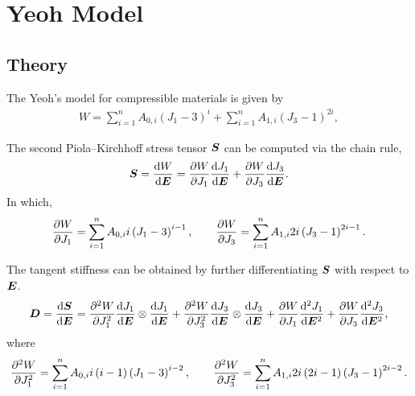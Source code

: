\section{Yeoh Model}
\subsection{Theory}
The Yeoh's model for compressible materials is given by
\begin{gather}
    W=\sum_{i=1}^nA_{0,i}\left(J_1-3\right)^i+\sum_{i=1}^nA_{1,i}\left(J_3-1\right)^{2i},
\end{gather}

The second Piola--Kirchhoff stress tensor $\bm{S}$ can be computed via the chain rule,
\begin{gather}
    \bm{S}=\dfrac{\mathrm{d}W}{\mathrm{d}\bm{E}}=\dfrac{\partial{W}}{\partial{J_1}}\dfrac{\mathrm{d}J_1}{\mathrm{d}\bm{E}}+\dfrac{\partial{W}}{\partial{J_3}}\dfrac{\mathrm{d}J_3}{\mathrm{d}\bm{E}}.
\end{gather}
In which,
\begin{gather}
    \dfrac{\partial{W}}{\partial{J_1}}=\sum_{i=1}^nA_{0,i}i\left(J_1-3\right)^{i-1},\qquad
    \dfrac{\partial{W}}{\partial{J_3}}=\sum_{i=1}^nA_{1,i}2i\left(J_3-1\right)^{2i-1}.
\end{gather}

The tangent stiffness can be obtained by further differentiating $\bm{S}$ with respect to $\bm{E}$.
\begin{gather}
    \bm{D}=\dfrac{\mathrm{d}\bm{S}}{\mathrm{d}\bm{E}}=\dfrac{\partial{^2W}}{\partial{J_1^2}}\dfrac{\mathrm{d}J_1}{\mathrm{d}\bm{E}}\otimes\dfrac{\mathrm{d}J_1}{\mathrm{d}\bm{E}}+\dfrac{\partial{^2W}}{\partial{J_3^2}}\dfrac{\mathrm{d}J_3}{\mathrm{d}\bm{E}}\otimes\dfrac{\mathrm{d}J_3}{\mathrm{d}\bm{E}}+\dfrac{\partial{W}}{\partial{J_1}}\dfrac{\mathrm{d}^2J_1}{\mathrm{d}\bm{E}^2}+\dfrac{\partial{W}}{\partial{J_3}}\dfrac{\mathrm{d}^2J_3}{\mathrm{d}\bm{E}^2},
\end{gather}
where
\begin{gather}
    \dfrac{\partial{^2W}}{\partial{J_1^2}}=\sum_{i=1}^nA_{0,i}i\left(i-1\right)\left(J_1-3\right)^{i-2},\qquad
    \dfrac{\partial{^2W}}{\partial{J_3^2}}=\sum_{i=1}^nA_{1,i}2i\left(2i-1\right)\left(J_3-1\right)^{2i-2}.
\end{gather}
